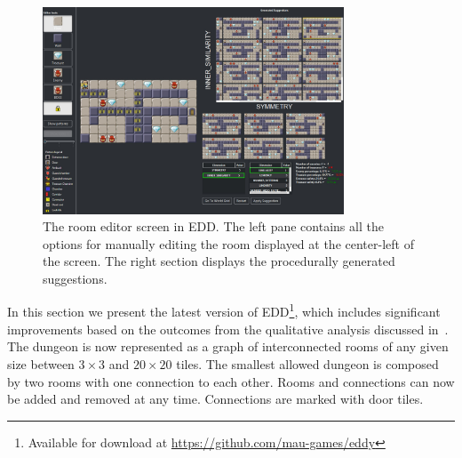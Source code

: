 
\begin{figure}[t]
\centerline{\includegraphics[width=0.8\textwidth]{figures/figure1.png}}
\caption{The room editor screen in EDD. The left pane contains all the options for manually editing the room displayed at the center-left of the screen. The right section displays the procedurally generated suggestions.}
\label{figs:roomscreen}
\end{figure}

In this section we present the latest version of EDD\footnote{Available for download at \url{https://github.com/mau-games/eddy}}, which includes significant improvements based on the outcomes from the qualitative analysis discussed in~. The dungeon is now represented as a graph of interconnected rooms of any given size between $3\times3$ and $20\times20$ tiles. The smallest allowed dungeon is composed by two rooms with one connection to each other. Rooms and connections can now be added and removed at any time. Connections are marked with door tiles.




